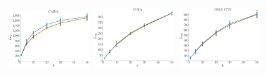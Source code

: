 \documentclass[a4paper]{report}
\newcommand{\wratio}{0.16}
\begin{document}
\includegraphics[width=\wratio\textwidth]{maxcut/CAIDA/fs_caida}\hfill
\includegraphics[width=\wratio\textwidth]{maxcut/CORA/fs_cora}\hfill
\includegraphics[width=\wratio\textwidth]{maxcut/DBLP_CITE/fs_dblp_cite}\hfill
\end{document}
